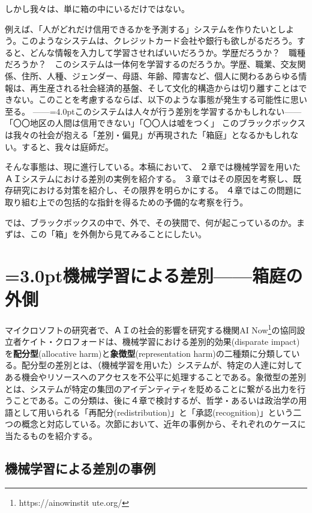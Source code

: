 \documentclass[b5j,twoside,twocolumn]{utarticle}
\begin{document}
しかし我々は、単に箱の中にいるだけではない。


例えば、「人がどれだけ信用できるかを予測する」システムを作りたいとしよう。このようなシステムは、クレジットカード会社や銀行も欲しがるだろう。すると、どんな情報を入力して学習させればいいだろうか。学歴だろうか？　職種だろうか？　このシステムは一体何を学習するのだろうか。学歴、職業、交友関係、住所、人種、ジェンダー、母語、年齢、障害など、個人に関わるあらゆる情報は、再生産される社会経済的基盤、そして文化的構造からは切り離すことはできない。このことを考慮するならば、以下のような事態が発生する可能性に思い至る。
\tbaselineshift=2.5pt------\tbaselineshift=4.0ptこのシステムは人々が行う差別を学習するかもしれない\tbaselineshift=2.5pt------\tbaselineshift=4.0pt「〇〇地区の人間は信用できない」「〇〇人は嘘をつく」
このブラックボックスは我々の社会が抱える「差別・偏見」が再現された「箱庭」となるかもしれない。すると、我々は庭師だ。


そんな事態は、現に進行している。本稿において、
２章では機械学習を用いたＡＩシステムにおける差別の実例を紹介する。
３章ではその原因を考察し、既存研究における対策を紹介し、その限界を明らかにする。
４章ではこの問題に取り組む上での包括的な指針を得るための予備的な考察を行う。


では、ブラックボックスの中で、外で、その狭間で、何が起こっているのか。まずは、この「箱」を\.外\.側から見てみることにしたい。



\section{\tbaselineshift=3.0pt機械学習による差別------箱庭の外側}
マイクロソフトの研究者で、ＡＩの社会的影響を研究する機関AI Now\footnote{https://ainowinstit ute.org/}の協同設立者ケイト・クロフォードは、機械学習における差別的効果(disparate impact)を\textbf{配分型}(allocative  harm)と\textbf{象徴型}(representation harm)の二種類に分類している\cite{kate}。配分型の差別とは、（機械学習を用いた）システムが、特定の人達に対してある機会やリソースへのアクセスを不公平に処理することである。象徴型の差別とは、システムが特定の集団のアイデンティティを貶めることに繋がる出力を行うことである。この分類は、後に４章で検討するが、哲学・あるいは政治学の用語として用いられる「再配分(redistribution)」と「承認(recognition)」という二つの概念と対応している。次節において、近年の事例から、それぞれのケースに当たるものを紹介する。



\subsection{機械学習による差別の事例}
\end{document}

